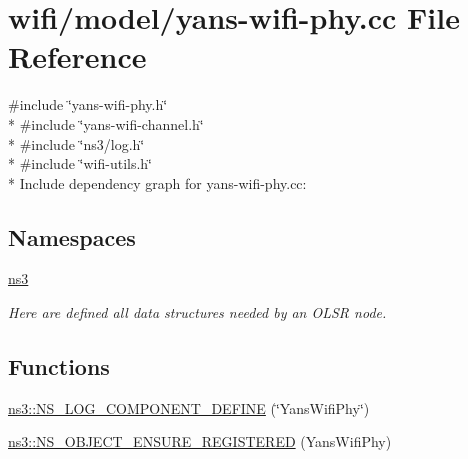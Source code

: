 \hypertarget{yans-wifi-phy_8cc}{}\section{wifi/model/yans-\/wifi-\/phy.cc File Reference}
\label{yans-wifi-phy_8cc}
{\ttfamily \#include \char`\"{}yans-\/wifi-\/phy.\+h\char`\"{}}\\*
{\ttfamily \#include \char`\"{}yans-\/wifi-\/channel.\+h\char`\"{}}\\*
{\ttfamily \#include \char`\"{}ns3/log.\+h\char`\"{}}\\*
{\ttfamily \#include \char`\"{}wifi-\/utils.\+h\char`\"{}}\\*
Include dependency graph for yans-\/wifi-\/phy.cc\+:
\subsection*{Namespaces}
\begin{DoxyCompactItemize}
\item 
 \hyperlink{namespacens3}{ns3}
\begin{DoxyCompactList}\small\item\em Here are defined all data structures needed by an O\+L\+SR node. \end{DoxyCompactList}\end{DoxyCompactItemize}
\subsection*{Functions}
\begin{DoxyCompactItemize}
\item 
\hyperlink{namespacens3_a0d183c6063886de817d13ced29f04420}{ns3\+::\+N\+S\+\_\+\+L\+O\+G\+\_\+\+C\+O\+M\+P\+O\+N\+E\+N\+T\+\_\+\+D\+E\+F\+I\+NE} (\char`\"{}Yans\+Wifi\+Phy\char`\"{})
\item 
\hyperlink{namespacens3_a3b9bbbd82269f0123938a6e79352bd13}{ns3\+::\+N\+S\+\_\+\+O\+B\+J\+E\+C\+T\+\_\+\+E\+N\+S\+U\+R\+E\+\_\+\+R\+E\+G\+I\+S\+T\+E\+R\+ED} (Yans\+Wifi\+Phy)
\end{DoxyCompactItemize}
